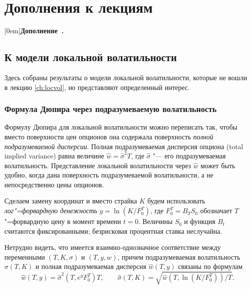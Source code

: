 \stopchaptertoc

\part*{Дополнения к лекциям}
[0em]{}{\textbf{Дополнение\ \thecontentslabel.}\hspace{2mm}}{}{\dotfill\contentspage}
\setcounter{chapter}{0}
\renewcommand{\theHchapter}{A\arabic{chapter}}%


\chapter{К модели локальной волатильности}
\label{ch:lv-s}

Здесь собраны результаты о модели локальной волатильности, которые не вошли в лекцию \ref{ch:locvol}, но представляют определенный интерес. 

\section{Формула Дюпира через подразумеваемую волатильность}

Формулу Дюпира для локальной волатильности можно переписать так, чтобы вместо поверхности цен опционов она содержала поверхность \emph{полной подразумеваемой дисперсии}.
Полная подразумеваемая дисперсия опциона (total implied variance) равна величине $\hat w = \hat\sigma^2 T$, где $\hat\sigma$ "--- его подразумеваемая волатильность.
Представление локальной волатильности через $\hat w$ может быть удобно, когда дана поверхность подразумеваемой волатильности, а не непосредственно цены опционов.

Сделаем замену координат и вместо страйка $K$ будем использовать \emph{лог"=форвардную денежность} $y=\ln (K/F_0^T)$, где $F_0^T = B_T S_0$ обозначает $T$"=форвардную цену в момент времени $t=0$.
Величины $S_0$ и функция $B_t$ считаются фиксированными; безрисковая процентная ставка неслучайна.

Нетрудно видеть, что имеется взаимно-однозначное соответствие между переменными $(T,K,\sigma)$ и $(T,y,w)$, причем подразумеваемая волатильность $\hat \sigma(T,K)$ и полная подразумеваемая дисперсия $\hat w(T,y)$ связаны по формулам 
\[
\hat w(T,y) = \hat\sigma^2(T, e^yF_0^T)T, \qquad \hat\sigma(T,K) = \sqrt{\hat w(T,\ln(K/F_0^T))/T}.
\]

